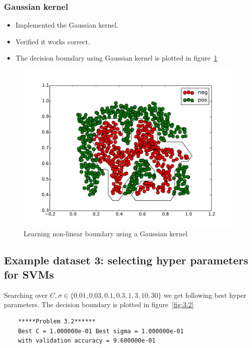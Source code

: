 \documentclass{article}
\begin{document}
\subsubsection{Gaussian kernel}
\begin{itemize}
	\item Implemented the Gaussian kernel.
	\item Verified it works correct.
	\item The decision boundary using Gaussian kernel is plotted in figure~\ref{fig:3.1_gb}
\end{itemize}

\begin{figure}[H]
	\centering
	\includegraphics[width=1\linewidth]{./fig4}
	\caption{Learning non-linear boundary using a Gaussian kernel}\label{fig:3.1_gb}
\end{figure}

\subsection{Example dataset 3: selecting hyper parameters for SVMs}
Searching over $C,\sigma \in \{0.01,0.03,0.1,0.3,1,3,10,30\}$ we get following best hyper parameters.
The decision boundary is plotted in figure~\ref{fig:3.2}
\begin{lstlisting}
	*****Problem 3.2******
	Best C = 1.000000e-01 Best sigma = 1.000000e-01
	with validation accuracy = 9.600000e-01
\end{lstlisting}
\end{document}
